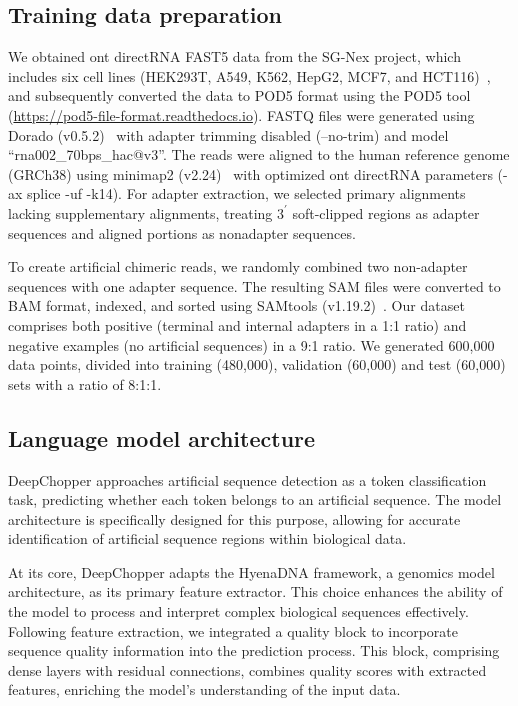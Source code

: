 \documentclass[pdflatex,sn-nature, lineno]{sn-jnl}%
\theoremstyle{thmstyleone}%
\theoremstyle{thmstyletwo}%
\theoremstyle{thmstylethree}%
\begin{document}
\subsection{Training data preparation}\label{ssec:data}

We obtained \gls{ont} directRNA FAST5 data from the SG-Nex project, which includes six cell lines (HEK293T, A549, K562, HepG2, MCF7, and HCT116)~\cite{chen2021systematic}, and subsequently converted the data to POD5 format using the POD5 tool (\url{https://pod5-file-format.readthedocs.io}).
FASTQ files were generated using Dorado (v0.5.2)~\cite{dorado2023} with adapter trimming disabled (--no-trim) and  model ``rna002\_70bps\_hac@v3''.
The reads were aligned to the human reference genome (GRCh38) using minimap2 (v2.24)~\cite{li2018minimap2} with optimized \gls{ont} directRNA parameters (-ax splice -uf -k14).
For adapter extraction, we selected primary alignments lacking supplementary alignments, treating \(3^{\prime}\)  soft-clipped regions as adapter sequences and aligned portions as nonadapter sequences.

To create artificial chimeric reads, we randomly combined two non-adapter sequences with one adapter sequence.
The resulting SAM files were converted to BAM format, indexed, and sorted using SAMtools (v1.19.2)~\cite{li2009sequence}.
Our dataset comprises both positive (terminal and internal adapters in a 1:1 ratio) and negative examples (no artificial sequences) in a 9:1 ratio.
We generated 600,000 data points, divided into training (480,000), validation (60,000) and test (60,000) sets with a ratio of 8:1:1.

\subsection{Language model architecture}\label{ssec:lm}

DeepChopper approaches artificial sequence detection as a token classification task, predicting whether each token belongs to an artificial sequence.
The model architecture is specifically designed for this purpose, allowing for accurate identification of artificial sequence regions within biological data.

At its core, DeepChopper adapts the HyenaDNA framework, a genomics model architecture, as its primary feature extractor.
This choice enhances the ability of the model to process and interpret complex biological sequences effectively.
Following feature extraction, we integrated a quality block to incorporate sequence quality information into the prediction process.
This block, comprising dense layers with residual connections, combines quality scores with extracted features, enriching the model's understanding of the input data.
\end{document}
